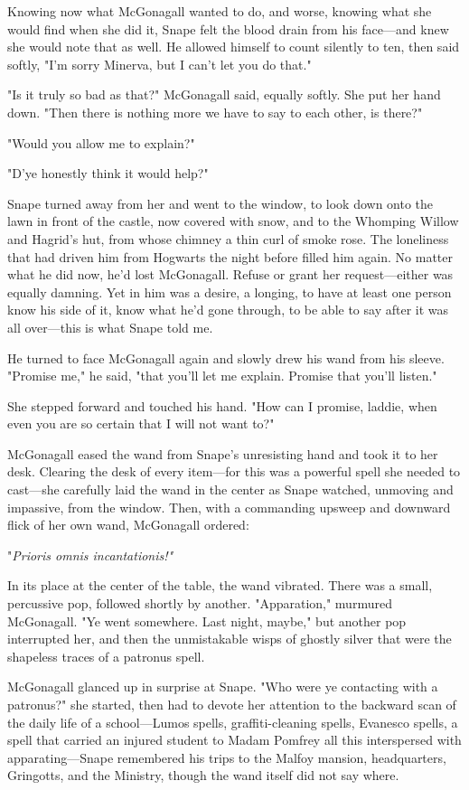 Knowing now what McGonagall wanted to do, and worse, knowing what she would find when she did it, Snape felt the blood drain from his face—and knew she would note that as well. He allowed himself to count silently to ten, then said softly, "I'm sorry Minerva, but I can't let you do that."

"Is it truly so bad as that?" McGonagall said, equally softly. She put her hand down. "Then there is nothing more we have to say to each other, is there?"

"Would you allow me to explain?"

"D'ye honestly think it would help?"

Snape turned away from her and went to the window, to look down onto the lawn in front of the castle, now covered with snow, and to the Whomping Willow and Hagrid's hut, from whose chimney a thin curl of smoke rose. The loneliness that had driven him from Hogwarts the night before filled him again. No matter what he did now, he'd lost McGonagall. Refuse or grant her request—either was equally damning. Yet in him was a desire, a longing, to have at least one person know his side of it, know what he'd gone through, to be able to say after it was all over—this is what Snape told me.

He turned to face McGonagall again and slowly drew his wand from his sleeve. "Promise me," he said, "that you'll let me explain. Promise that you'll listen."

She stepped forward and touched his hand. "How can I promise, laddie, when even you are so certain that I will not want to?"

McGonagall eased the wand from Snape's unresisting hand and took it to her desk. Clearing the desk of every item—for this was a powerful spell she needed to cast—she carefully laid the wand in the center as Snape watched, unmoving and impassive, from the window. Then, with a commanding upsweep and downward flick of her own wand, McGonagall ordered:

"\emph{Prioris omnis incantationis!"}

In its place at the center of the table, the wand vibrated. There was a small, percussive pop, followed shortly by another. "Apparation," murmured McGonagall. "Ye went somewhere. Last night, maybe," but another pop interrupted her, and then the unmistakable wisps of ghostly silver that were the shapeless traces of a patronus spell.

McGonagall glanced up in surprise at Snape. "Who were ye contacting with a patronus?" she started, then had to devote her attention to the backward scan of the daily life of a school—Lumos spells, graffiti-cleaning spells, Evanesco spells, a spell that carried an injured student to Madam Pomfrey{\el} all this interspersed with apparating—Snape remembered his trips to the Malfoy mansion, headquarters, Gringotts, and the Ministry, though the wand itself did not say where.

